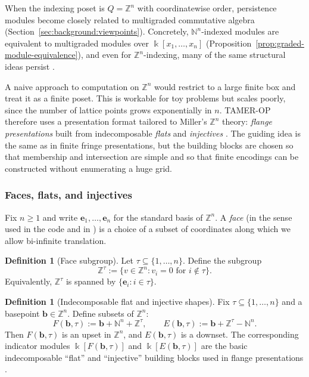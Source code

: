 \documentclass{article}
\newcommand{\kk}{\Bbbk}
\newcommand{\<}{\langle}
\renewcommand{\>}{\rangle}
\theoremstyle{definition}
\newtheorem{defn}[theorem]{Definition}
\theoremstyle{remark}
\begin{document}
	When the indexing poset is $Q=\mathbb{Z}^n$ with coordinatewise order, persistence modules become closely related to
	multigraded commutative algebra (Section~\ref{sec:background:viewpoints}).  Concretely, $\mathbb{N}^n$-indexed modules
	are equivalent to multigraded modules over $\kk[x_1,\dots,x_n]$ (Proposition~\ref{prop:graded-module-equivalence}),
	and even for $\mathbb{Z}^n$-indexing, many of the same structural ideas persist \cite{CZ09,Oud15}.
	
	A naive approach to computation on $\mathbb{Z}^n$ would restrict to a large finite box and treat it as a finite poset.
	This is workable for toy problems but scales poorly, since the number of lattice points grows exponentially in $n$.
	TAMER-OP therefore uses a presentation format tailored to Miller's $\mathbb{Z}^n$ theory: \emph{flange presentations}
	built from indecomposable \emph{flats} and \emph{injectives} \cite[\S5]{Mil20}.  The guiding idea is the same as in
	finite fringe presentations, but the building blocks are chosen so that membership and intersection are simple and so
	that finite encodings can be constructed without enumerating a huge grid.
	
	\subsubsection*{Faces, flats, and injectives}
	
	Fix $n\ge 1$ and write $\mathbf{e}_1,\dots,\mathbf{e}_n$ for the standard basis of $\mathbb{Z}^n$.
	A \emph{face} (in the sense used in the code and in \cite{Mil20}) is a choice of a subset of coordinates along which
	we allow bi-infinite translation.
	
	\begin{defn}[Face subgroup]\label{def:face-subgroup}
		Let $\tau\subseteq \{1,\dots,n\}$.
		Define the subgroup
		\[
		\mathbb{Z}^\tau := \{v\in \mathbb{Z}^n : v_i=0 \text{ for } i\notin \tau\}.
		\]
		Equivalently, $\mathbb{Z}^\tau$ is spanned by $\{\mathbf{e}_i : i\in\tau\}$.
	\end{defn}
	
	\begin{defn}[Indecomposable flat and injective shapes]\label{def:flat-injective-shapes}
		Fix $\tau\subseteq\{1,\dots,n\}$ and a basepoint $\mathbf{b}\in\mathbb{Z}^n$.
		Define subsets of $\mathbb{Z}^n$:
		\[
		F(\mathbf{b},\tau) := \mathbf{b} + \mathbb{N}^n + \mathbb{Z}^\tau,
		\qquad
		E(\mathbf{b},\tau) := \mathbf{b} + \mathbb{Z}^\tau - \mathbb{N}^n.
		\]
		Then $F(\mathbf{b},\tau)$ is an upset in $\mathbb{Z}^n$, and $E(\mathbf{b},\tau)$ is a downset.
		The corresponding indicator modules $\kk[F(\mathbf{b},\tau)]$ and $\kk[E(\mathbf{b},\tau)]$ are the basic
		indecomposable ``flat'' and ``injective'' building blocks used in flange presentations \cite{Mil20}.
	\end{defn}
	
\end{document}

